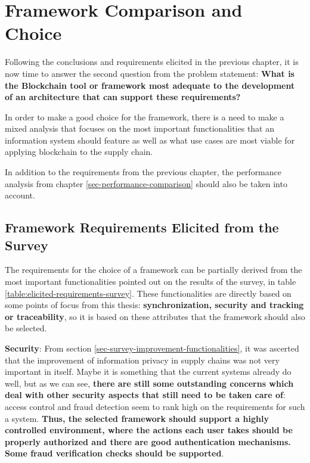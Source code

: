 \section{Framework Comparison and Choice}

Following the conclusions and requirements elicited in the previous chapter, it is now time to answer the second question from the problem statement: \textbf{What is the Blockchain tool or framework most adequate to the development of an architecture that can support these requirements?}

In order to make a good choice for the framework, there is a need to make a mixed analysis that focuses on the most important functionalities that an information system should feature as well as what use cases are most viable for applying blockchain to the supply chain. %

In addition to the requirements from the previous chapter, the performance analysis from chapter \ref{sec-performance-comparison} should also be taken into account. %

\subsection{Framework Requirements Elicited from the Survey}

The requirements for the choice of a framework can be partially derived from the most important functionalities pointed out on the results of the survey, in table \ref{table:elicited-requirements-survey}. These functionalities are directly based on some points of focus from this thesis: \textbf{synchronization, security and tracking or traceability}, so it is based on these attributes that the framework should also be selected.   

\par \textbf{Security}: From section \ref{sec-survey-improvement-functionalities}, it was ascerted that the improvement of information privacy in supply chains was not very important in itself. Maybe it is something that the current systems already do well, but as we can see, \textbf{there are still some outstanding concerns which deal with other security aspects that still need to be taken care of}: access control and fraud detection seem to rank high on the requirements for such a system. \textbf{Thus, the selected framework should support a highly controlled environment, where the actions each user takes should be properly authorized and there are good authentication mechanisms. Some fraud verification checks should be supported}.

